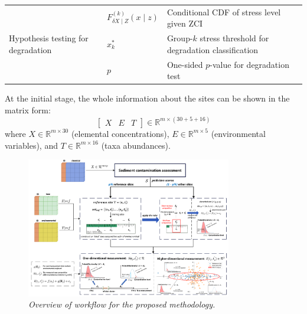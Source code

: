 \begin{table}[!h]
\begin{tabular}{lll}
\multirow{3}{*}{\parbox{3cm}{\centering Hypothesis testing for degradation}} 
& $F_{\delta X\mid Z}^{(k)}(x \mid z)$ & Conditional CDF of stress level given ZCI \\
& $x_k^*$ & Group-$k$ stress threshold for degradation classification \\
& $p$ & One-sided $p$-value for degradation test \\
\bottomrule
\end{tabular}
\end{table}


At the initial stage, the whole information about the sites can be shown in the matrix form:
\[
\left[
\begin{array}{ccc}
X & E & T
\end{array}
\right]
\in
\mathbb{R}^{m \times (30 + 5 + 16)}
\]
where
\(X \in \mathbb{R}^{m \times 30}\) (elemental concentrations),
\(E \in \mathbb{R}^{m \times 5}\) (environmental variables),
and
\(T \in \mathbb{R}^{m \times 16}\) (taxa abundances).

\begin{figure}
\centering
\includegraphics[width=0.8\textwidth]{../results/ideas_visualization/overall_framework.png}  
\caption{\textit{Overview of workflow for the proposed methodology.}}
\end{figure}
